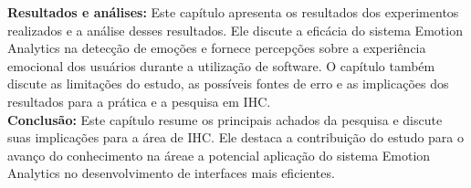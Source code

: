 \begin{resumo-portugues}
  \textbf{Resultados e análises:} Este capítulo apresenta os resultados dos experimentos realizados e a análise desses resultados. Ele discute a eficácia do sistema Emotion Analytics na detecção de emoções e fornece percepções sobre a experiência emocional dos usuários durante a utilização de software. O capítulo também discute as limitações do estudo, as possíveis fontes de erro e as implicações dos resultados para a prática e a pesquisa em IHC.
  \\

  \textbf{Conclusão:} Este capítulo resume os principais achados da pesquisa e discute suas implicações para a área de IHC. Ele destaca a contribuição do estudo para o avanço do conhecimento na áreae a potencial aplicação do sistema Emotion Analytics no desenvolvimento de interfaces mais eficientes.
\end{resumo-portugues}
